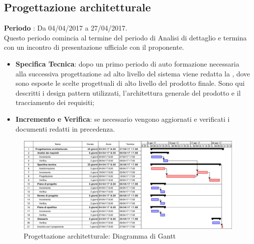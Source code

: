 \documentclass[../PianoDiProgetto.tex]{subfiles}
\begin{document}
		\subsection{Progettazione architetturale}
		\textbf{Periodo} : Da 04/04/2017 a 27/04/2017. \\
		Questo periodo comincia al termine del periodo di Analisi di dettaglio e termina con un incontro di presentazione ufficiale con il proponente.
		\begin{itemize}
			\item \textbf{Specifica Tecnica}: dopo un primo periodo di auto formazione necessaria alla successiva progettazione ad alto livello del sistema viene redatta la \specificatecnica, dove sono esposte le scelte progettuali di alto livello del prodotto finale. Sono qui descritti i design pattern utilizzati, l'architettura generale del prodotto e il tracciamento dei requisiti;
			\item \textbf{Incremento e Verifica}: se necessario vengono aggiornati e verificati i documenti redatti in precedenza.
		\end{itemize}
		\begin{figure}[H]
			\centering
			\includegraphics[scale=0.55]{Figures/Gantt_ProgettazioneArchitetturale}
			\caption{Progettazione architetturale: Diagramma di Gantt}
		\end{figure}
		
		
		
\end{document}
